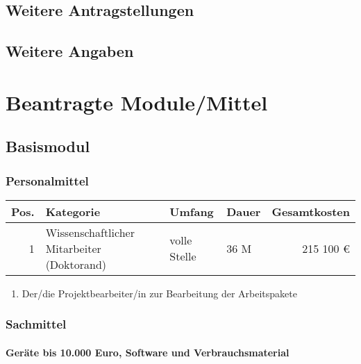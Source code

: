\documentclass[de]{dfg-proposal}
\begin{document}
        \subsection{Weitere Antragstellungen}

        \subsection{Weitere Angaben}


    \section{Beantragte Module/Mittel}\label{sec:beantragte-module/mittel}

        \subsection{Basismodul}

            \subsubsection{Personalmittel}

                \begin{tabularx}{\linewidth}{rXllr}
                    \toprule
                    Pos. & Kategorie                                  & Umfang       & Dauer & Gesamtkosten \\
                    \midrule
                    1    & Wissenschaftlicher Mitarbeiter (Doktorand) & volle Stelle & 36 M  & 215 100 €    \\
                    \bottomrule
                \end{tabularx}

                \begin{enumerate}
                    \item Der/die Projektbearbeiter/in zur Bearbeitung der Arbeitspakete
                \end{enumerate}

            \subsubsection{Sachmittel}

                \paragraph{Geräte bis 10.000 Euro, Software und Verbrauchsmaterial}
\end{document}
